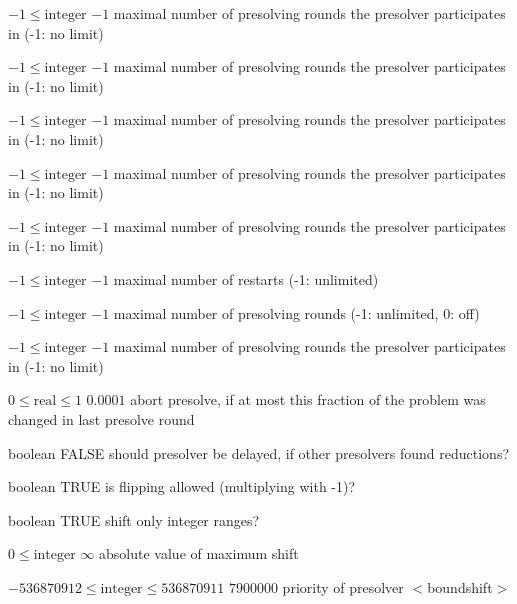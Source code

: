 %
{$-1\leq\textrm{integer}$}%
{$-1$}%
{maximal number of presolving rounds the presolver participates in (-1: no limit)}%
{}

%
{$-1\leq\textrm{integer}$}%
{$-1$}%
{maximal number of presolving rounds the presolver participates in (-1: no limit)}%
{}

%
{$-1\leq\textrm{integer}$}%
{$-1$}%
{maximal number of presolving rounds the presolver participates in (-1: no limit)}%
{}

%
{$-1\leq\textrm{integer}$}%
{$-1$}%
{maximal number of presolving rounds the presolver participates in (-1: no limit)}%
{}

%
{$-1\leq\textrm{integer}$}%
{$-1$}%
{maximal number of presolving rounds the presolver participates in (-1: no limit)}%
{}

%
{$-1\leq\textrm{integer}$}%
{$-1$}%
{maximal number of restarts (-1: unlimited)}%
{}

%
{$-1\leq\textrm{integer}$}%
{$-1$}%
{maximal number of presolving rounds (-1: unlimited, 0: off)}%
{}

%
{$-1\leq\textrm{integer}$}%
{$-1$}%
{maximal number of presolving rounds the presolver participates in (-1: no limit)}%
{}

%
{$0\leq\textrm{real}\leq1$}%
{$0.0001$}%
{abort presolve, if at most this fraction of the problem was changed in last presolve round}%
{}

%
{boolean}%
{FALSE}%
{should presolver be delayed, if other presolvers found reductions?}%
{}

%
{boolean}%
{TRUE}%
{is flipping allowed (multiplying with -1)?}%
{}

%
{boolean}%
{TRUE}%
{shift only integer ranges?}%
{}

%
{$0\leq\textrm{integer}$}%
{$\infty$}%
{absolute value of maximum shift}%
{}

%
{$-536870912\leq\textrm{integer}\leq536870911$}%
{$7900000$}%
{priority of presolver $<$boundshift$>$}%
{}

